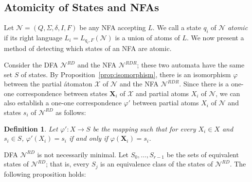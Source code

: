 \documentclass[preprint,12pt]{elsarticle}
\newcommand{\Sig}{\Sigma}
\newcommand{\cN}{{\mathcal N}}
\newcommand{\cX}{{\mathcal X}}
\newcommand{\rev}{R}
\newcommand{\deter}{D}
\newtheorem{definition}{Definition}
\begin{document}
\subsection{Atomicity of States and NFAs}
\label{sec:detecting}

Let $\cN=(Q, \Sig, \delta, I,F)$ be any NFA accepting $L$.
We call a state $q_i$ of $\cN$ \emph{atomic} if its right language
$L_i=L_{q_i,F}(\cN)$ is a union of atoms of $L$. 
We now present a method of detecting which states of an NFA
are atomic.

Consider the DFA $\cN^{\rev\deter}$ and the NFA $\cN^{\rev\deter\rev}$;
these two automata have the same set $S$ of states. 
By Proposition~\ref{prop:isomorphism}, there is an isomorphism $\varphi$
between the partial \'atomaton $\cX$ of $\cN$ and the NFA $\cN^{\rev\deter\rev}$. 
Since there is a one-one correspondence between states ${\mathbf X}_i$ of 
$\cX$ and partial atoms $X_i$ of $\cN$, we can also establish a one-one 
correspondence $\varphi'$ between partial atoms $X_i$ of $\cN$ and 
states $s_i$ of $\cN^{\rev\deter}$ as follows:

\begin{definition}
\label{def:mapping}
Let $\varphi' : X \to S$ be the mapping such that for every $X_i\in X$ and 
$s_i\in S$, $\varphi'(X_i)= s_i$ if and only if $\varphi({\mathbf X}_i)= s_i$. 
\end{definition}


DFA $\cN^{\rev\deter}$ is not necessarily minimal. 
Let $S_0,\ldots,S_{r-1}$ be the sets of equivalent states 
of $\cN^{\rev\deter}$; that is, every $S_j$ is an equivalence class of 
the states of $\cN^{\rev\deter}$. 
The following proposition holds:
\end{document}

